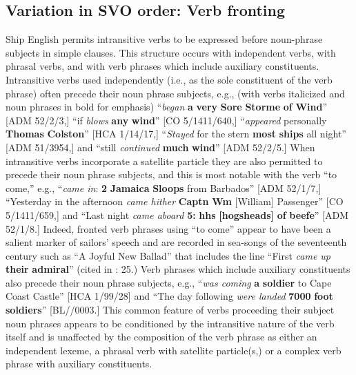 \subsection{{Variation} {in} {SVO} {order:} {Verb} {fronting}}%

  Ship English permits intransitive verbs to be expressed before noun-phrase subjects in simple clauses. This structure occurs with independent verbs, with phrasal verbs, and with verb phrases which include auxiliary constituents. Intransitive verbs used independently (i.e., as the sole constituent of the verb phrase) often precede their noun phrase subjects, e.g., (with verbs italicized and noun phrases in bold for emphasis) “\textit{began} \textbf{a} \textbf{very} \textbf{Sore} \textbf{Storme} \textbf{of} \textbf{Wind}” [ADM 52/2/3,] “if \textit{blows} \textbf{any} \textbf{wind}” [CO 5/1411/640,] “\textit{appeared} personally \textbf{Thomas} \textbf{Colston}” [HCA 1/14/17,] “\textit{Stayed} for the stern \textbf{most} \textbf{ships} all night” [ADM 51/3954,] and “still \textit{continued} \textbf{much} \textbf{wind}” [ADM 52/2/5.] When intransitive verbs incorporate a satellite particle they are also permitted to precede their noun phrase subjects, and this is most notable with the verb “to come,” e.g., “\textit{came in}: \textbf{2} \textbf{Jamaica} \textbf{Sloops} from Barbados” [ADM 52/1/7,] “Yesterday in the afternoon \textit{came hither} \textbf{Captn} \textbf{Wm} [William] Passenger” [CO 5/1411/659,] and “Last night \textit{came aboard} \textbf{5:} \textbf{hhs} \textbf{[hogsheads]} \textbf{of} \textbf{beefe}” [ADM 52/1/8.] Indeed, fronted verb phrases using “to come” appear to have been a salient marker of sailors’ speech and are recorded in sea-songs of the seventeenth century such as “A Joyful New Ballad” that includes the line “First \textit{came up} \textbf{their} \textbf{admiral}” (cited in \citealt{Palmer1986}: 25.) Verb phrases which include auxiliary constituents also precede their noun phrase subjects, e.g., “\textit{was coming} \textbf{a} \textbf{soldier} to Cape Coast Castle” [HCA 1/99/28] and “The day following \textit{were landed} \textbf{7000} \textbf{foot} \textbf{soldiers}” [BL/\citealt{Egerton2395}/0003.] This common feature of verbs proceeding their subject noun phrases appears to be conditioned by the intransitive nature of the verb itself and is unaffected by the composition of the verb phrase as either an independent lexeme, a phrasal verb with satellite particle(s,) or a complex verb phrase with auxiliary constituents. 

